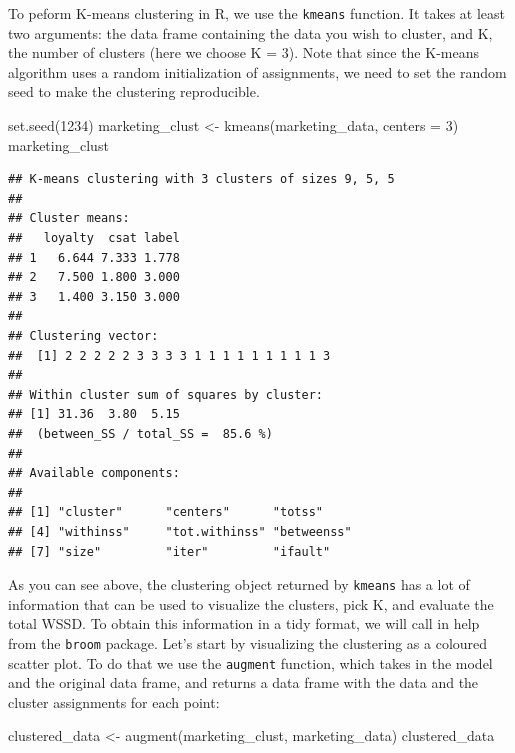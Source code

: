\documentclass[
]{krantz}
\makeatletter
\newenvironment{Shaded}{\begin{snugshade}}{\end{snugshade}}
\newcommand{\AttributeTok}[1]{\textcolor[rgb]{0.61,0.61,0.61}{#1}}
\newcommand{\DecValTok}[1]{\textcolor[rgb]{0.06,0.06,0.06}{#1}}
\newcommand{\FunctionTok}[1]{\textcolor[rgb]{0,0,0}{#1}}
\newcommand{\NormalTok}[1]{#1}
\newcommand{\OtherTok}[1]{\textcolor[rgb]{0.37,0.37,0.37}{#1}}
\newenvironment{kframe}{%
\medskip{}
\setlength{\fboxsep}{.8em}
 \def\at@end@of@kframe{}%
 \ifinner\ifhmode%
  \def\at@end@of@kframe{\end{minipage}}%
  \begin{minipage}{\columnwidth}%
 \fi\fi%
 \def\FrameCommand##1{\hskip\@totalleftmargin \hskip-\fboxsep
 \colorbox{shadecolor}{##1}\hskip-\fboxsep
     \hskip-\linewidth \hskip-\@totalleftmargin \hskip\columnwidth}%
 \MakeFramed {\advance\hsize-\width
   \@totalleftmargin\z@ \linewidth\hsize
   \@setminipage}}%
 {\par\unskip\endMakeFramed%
 \at@end@of@kframe}
\renewenvironment{Shaded}{\begin{kframe}}{\end{kframe}}
\makeatother
\begin{document}
To peform K-means clustering in R, we use the \texttt{kmeans} function. It takes at
least two arguments: the data frame containing the data you wish to cluster,
and K, the number of clusters (here we choose K = 3). Note that since the K-means
algorithm uses a random initialization of assignments, we need to set the random
seed to make the clustering reproducible.

\begin{Shaded}
\begin{Highlighting}[]
\FunctionTok{set.seed}\NormalTok{(}\DecValTok{1234}\NormalTok{)}
\NormalTok{marketing\_clust }\OtherTok{\textless{}{-}} \FunctionTok{kmeans}\NormalTok{(marketing\_data, }\AttributeTok{centers =} \DecValTok{3}\NormalTok{)}
\NormalTok{marketing\_clust}
\end{Highlighting}
\end{Shaded}

\begin{verbatim}
## K-means clustering with 3 clusters of sizes 9, 5, 5
## 
## Cluster means:
##   loyalty  csat label
## 1   6.644 7.333 1.778
## 2   7.500 1.800 3.000
## 3   1.400 3.150 3.000
## 
## Clustering vector:
##  [1] 2 2 2 2 2 3 3 3 3 1 1 1 1 1 1 1 1 1 3
## 
## Within cluster sum of squares by cluster:
## [1] 31.36  3.80  5.15
##  (between_SS / total_SS =  85.6 %)
## 
## Available components:
## 
## [1] "cluster"      "centers"      "totss"       
## [4] "withinss"     "tot.withinss" "betweenss"   
## [7] "size"         "iter"         "ifault"
\end{verbatim}

As you can see above, the clustering object returned by \texttt{kmeans} has a lot of information
that can be used to visualize the clusters, pick K, and evaluate the total WSSD.
To obtain this information in a tidy format, we will call in help
from the \texttt{broom} package. Let's start by visualizing the clustering
as a coloured scatter plot. To do that
we use the \texttt{augment} function, which takes in the model and the original data
frame, and returns a data frame with the data and the cluster assignments for
each point:

\begin{Shaded}
\begin{Highlighting}[]
\NormalTok{clustered\_data }\OtherTok{\textless{}{-}} \FunctionTok{augment}\NormalTok{(marketing\_clust, marketing\_data)}
\NormalTok{clustered\_data}
\end{Highlighting}
\end{Shaded}
\end{document}
